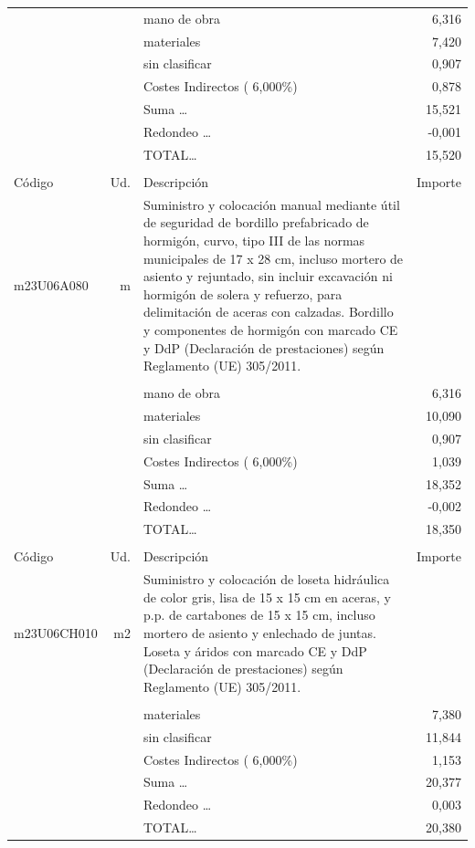\begin{supertabular}{l r p{60mm} r}
&&mano de obra&     6,316\\%
&&materiales&     7,420\\%
&&sin clasificar&     0,907\\%
&&Costes Indirectos (     6,000\%)&     0,878\\%
&&Suma \ldots&    15,521\\%
&&Redondeo \ldots&    {-}0,001\\%
%
&&TOTAL\ldots&    15,520\\%
&&&\\%
Código&Ud.&Descripción&Importe\\%
\hline%
m23U06A080&m&Suministro y colocación manual mediante útil de seguridad de bordillo prefabricado de hormigón, curvo, tipo III de las normas municipales de 17 x 28 cm, incluso mortero de asiento y rejuntado, sin incluir excavación ni hormigón de solera y refuerzo, para delimitación de aceras con calzadas. Bordillo y componentes de hormigón con marcado CE y DdP (Declaración de prestaciones) según Reglamento (UE) 305/2011.&\\%
&&&\\%
&&mano de obra&     6,316\\%
&&materiales&    10,090\\%
&&sin clasificar&     0,907\\%
&&Costes Indirectos (     6,000\%)&     1,039\\%
&&Suma \ldots&    18,352\\%
&&Redondeo \ldots&    {-}0,002\\%
%
&&TOTAL\ldots&    18,350\\%
&&&\\%
Código&Ud.&Descripción&Importe\\%
\hline%
m23U06CH010&m2&Suministro y colocación de loseta hidráulica de color gris, lisa de 15 x 15 cm en aceras, y p.p. de cartabones de 15 x 15 cm, incluso mortero de asiento y enlechado de juntas. Loseta y áridos con marcado CE y DdP (Declaración de prestaciones) según Reglamento (UE) 305/2011.&\\%
&&&\\%
&&materiales&     7,380\\%
&&sin clasificar&    11,844\\%
&&Costes Indirectos (     6,000\%)&     1,153\\%
&&Suma \ldots&    20,377\\%
&&Redondeo \ldots&     0,003\\%
%
&&TOTAL\ldots&    20,380\\%

\end{supertabular}

